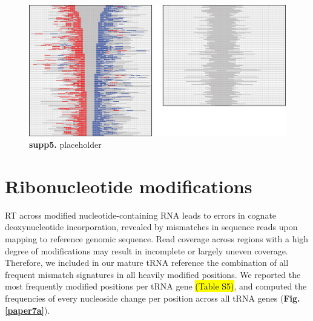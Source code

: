 \documentclass[12pt]{rockefeller}
\begin{document}
\begin{figure}[!ht]%
\centering
\includegraphics[width=\textwidth]{supp5.png}%
\caption[supp5]
{\textbf{supp5.}
placeholder}
\centering
\label{supp5}%
\end{figure}

\section{Ribonucleotide modifications}

RT across modified nucleotide-containing RNA leads to errors in cognate deoxynucleotide incorporation, revealed by mismatches in sequence reads upon mapping to reference genomic sequence. Read coverage across regions with a high degree of modifications may result in incomplete or largely uneven coverage. Therefore, we included in our mature tRNA reference the combination of all frequent mismatch signatures in all heavily modified positions. We reported the most frequently modified positions per tRNA gene \hl{(Table S5)}, and computed the frequencies of every nucleoside change per position across all tRNA genes (\textbf{Fig. \ref{paper7a}}). 
\end{document}
